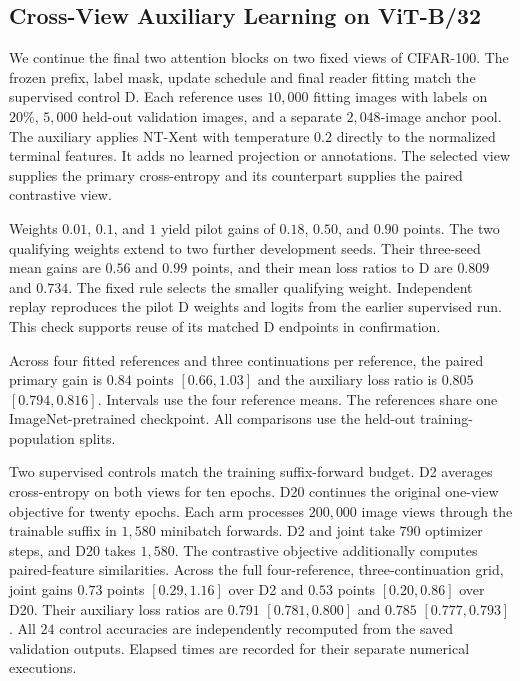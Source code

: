 \subsection{Cross-View Auxiliary Learning on ViT-B/32}\label{app:contrastive_visual}

We continue the final two attention blocks on two fixed views of CIFAR-100.
The frozen prefix, label mask, update schedule and final reader fitting
match the supervised control D. Each reference uses $10{,}000$ fitting
images with labels on $20\%$, $5{,}000$ held-out validation images, and a
separate $2{,}048$-image anchor pool. The auxiliary applies NT-Xent with
temperature $0.2$ directly to the normalized terminal features. It adds no
learned projection or annotations. The selected view supplies the primary
cross-entropy and its counterpart supplies the paired contrastive view.

Weights $0.01$, $0.1$, and $1$ yield pilot gains of $0.18$, $0.50$, and
$0.90$ points. The two qualifying weights extend to two further development
seeds. Their three-seed mean gains are $0.56$ and $0.99$ points, and their
mean loss ratios to D are $0.809$ and $0.734$. The fixed rule selects the
smaller qualifying weight. Independent replay reproduces the pilot D
weights and logits from the earlier supervised run. This check supports
reuse of its matched D endpoints in confirmation.

Across four fitted references and three continuations per reference, the
paired primary gain is $0.84$ points $[0.66,1.03]$ and the auxiliary loss
ratio is $0.805$ $[0.794,0.816]$. Intervals use the four reference means.
The references share one ImageNet-pretrained checkpoint. All comparisons
use the held-out training-population splits.

Two supervised controls match the training suffix-forward budget.
D2 averages cross-entropy on both views for ten epochs. D20 continues the
original one-view objective for twenty epochs. Each arm processes
$200{,}000$ image views through the trainable suffix in $1{,}580$ minibatch
forwards. D2 and joint take $790$ optimizer steps, and D20 takes $1{,}580$.
The contrastive objective additionally computes paired-feature similarities.
Across the full four-reference, three-continuation grid, joint gains
$0.73$ points $[0.29,1.16]$ over D2 and $0.53$ points $[0.20,0.86]$
over D20. Their auxiliary loss ratios are $0.791$ $[0.781,0.800]$ and
$0.785$ $[0.777,0.793]$. All $24$ control accuracies are independently
recomputed from the saved validation outputs. Elapsed times are recorded
for their separate numerical executions.

